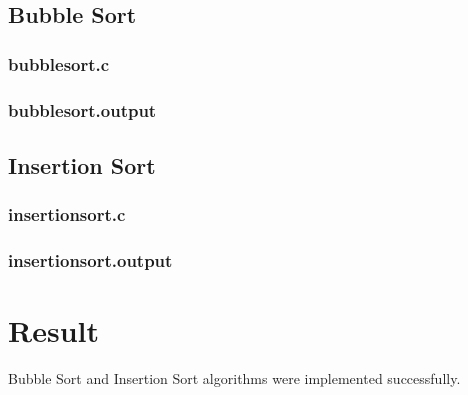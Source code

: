 \subsection{Bubble Sort}

\subsubsection{bubblesort.c}



\subsubsection{bubblesort.output}



\subsection{Insertion Sort}

\subsubsection{insertionsort.c}



\subsubsection{insertionsort.output}



\vfill

\section{Result}
{\Large\color{white}
Bubble Sort and Insertion Sort algorithms were implemented successfully.
\color{black}}

\clearpage
